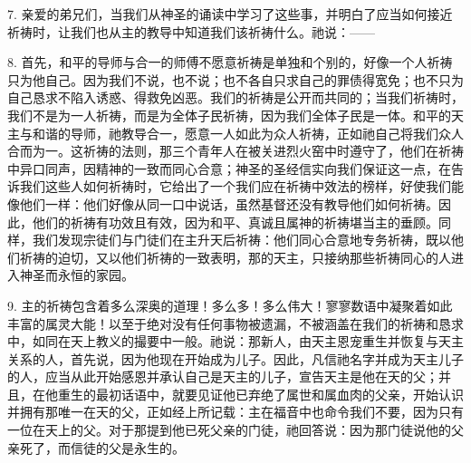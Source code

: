 7. 亲爱的弟兄们，当我们从神圣的诵读中学习了这些事，并明白了应当如何接近祈祷时，让我们也从主的教导中知道我们该祈祷什么。祂说：——\par

\newline{}\par

8. 首先，和平的导师与合一的师傅不愿意祈祷是单独和个别的，好像一个人祈祷只为他自己。因为我们不说，也不说；也不各自只求自己的罪债得宽免；也不只为自己恳求不陷入诱惑、得救免凶恶。我们的祈祷是公开而共同的；当我们祈祷时，我们不是为一人祈祷，而是为全体子民祈祷，因为我们全体子民是一体。和平的天主与和谐的导师，祂教导合一，愿意一人如此为众人祈祷，正如祂自己将我们众人合而为一。这祈祷的法则，那三个青年人在被关进烈火窑中时遵守了，他们在祈祷中异口同声，因精神的一致而同心合意；神圣的圣经信实向我们保证这一点，在告诉我们这些人如何祈祷时，它给出了一个我们应在祈祷中效法的榜样，好使我们能像他们一样：他们好像从同一口中说话，虽然基督还没有教导他们如何祈祷。因此，他们的祈祷有功效且有效，因为和平、真诚且属神的祈祷堪当主的垂顾。同样，我们发现宗徒们与门徒们在主升天后祈祷：\newline{}他们同心合意地专务祈祷，既以他们祈祷的迫切，又以他们祈祷的一致表明，那的天主，只接纳那些祈祷同心的人进入神圣而永恒的家园。\par

9. 主的祈祷包含着多么深奥的道理！多么多！多么伟大！寥寥数语中凝聚着如此丰富的属灵大能！以至于绝对没有任何事物被遗漏，不被涵盖在我们的祈祷和恳求中，如同在天上教义的撮要中一般。祂说：那新人，由天主恩宠重生并恢复与天主关系的人，首先说，因为他现在开始成为儿子。\newline{}因此，凡信祂名字并成为天主儿子的人，应当从此开始感恩并承认自己是天主的儿子，宣告天主是他在天的父；并且，在他重生的最初话语中，就要见证他已弃绝了属世和属血肉的父亲，开始认识并拥有那唯一在天的父，正如经上所记载：\newline{}主在福音中也命令我们不要，因为只有一位在天上的父。\newline{}对于那提到他已死父亲的门徒，祂回答说：\newline{}因为那门徒说他的父亲死了，而信徒的父是永生的。\par

